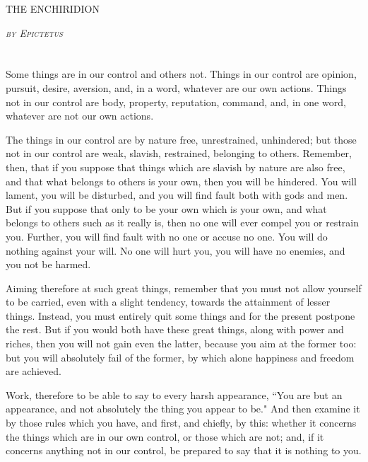 \documentclass[12pt]{article}
\begin{document}
\begin{center}
\textsc{\LARGE THE ENCHIRIDION}\\[1.5em]
\par
\textsc{\Large \emph{by Epictetus}}
\end{center}

\section{}

Some things are in our control and others not. Things in our control
are opinion, pursuit, desire, aversion, and, in a word, whatever are
our own actions. Things not in our control are body, property, reputation,
command, and, in one word, whatever are not our own actions.

The things in our control are by nature free, unrestrained, unhindered;
but those not in our control are weak, slavish, restrained, belonging
to others. Remember, then, that if you suppose that things which are
slavish by nature are also free, and that what belongs to others is
your own, then you will be hindered. You will lament, you will be
disturbed, and you will find fault both with gods and men. But if
you suppose that only to be your own which is your own, and what belongs
to others such as it really is, then no one will ever compel you or
restrain you. Further, you will find fault with no one or accuse no
one. You will do nothing against your will. No one will hurt you,
you will have no enemies, and you not be harmed. 

Aiming therefore at such great things, remember that you must not
allow yourself to be carried, even with a slight tendency, towards
the attainment of lesser things. Instead, you must entirely quit some
things and for the present postpone the rest. But if you would both
have these great things, along with power and riches, then you will
not gain even the latter, because you aim at the former too: but you
will absolutely fail of the former, by which alone happiness and freedom
are achieved. 

Work, therefore to be able to say to every harsh appearance, ``You
are but an appearance, and not absolutely the thing you appear to
be." And then examine it by those rules which you have, and first,
and chiefly, by this: whether it concerns the things which are in
our own control, or those which are not; and, if it concerns anything
not in our control, be prepared to say that it is nothing to you.

\section{}
\end{document}

